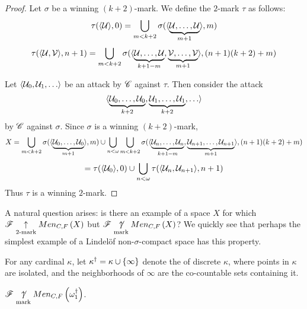 \begin{proof}
  Let $\sigma$ be a winning $(k+2)$-mark. We define the $2$-mark $\tau$ as
  follows:
    \[
      \tau(\langle\mathcal{U}\rangle,0)
        =
      \bigcup_{m<k+2}
        \sigma(\langle\underbrace{\mathcal{U},\dots,\mathcal{U}}_{m+1}\rangle,m)
    \]
    \[
      \tau(\langle\mathcal{U},\mathcal{V}\rangle,n+1)
        =
      \bigcup_{m<k+2}
        \sigma(\langle
          \underbrace{\mathcal{U},\dots,\mathcal{U}}_{k+1-m},
          \underbrace{\mathcal{V},\dots,\mathcal{V}}_{m+1}
        \rangle,(n+1)(k+2)+m)
    \]

  Let $\<\mc U_0,\mc U_1,\dots\>$ be an attack by $\mathscr{C}$ against $\tau$.
  Then consider the attack
    \[
      \<
        \underbrace{\mc U_0,\dots,\mc U_0}_{k+2},
        \underbrace{\mc U_1,\dots,\mc U_1}_{k+2},
        \dots
      \>
    \]
  by $\mathscr{C}$ against $\sigma$. Since $\sigma$ is a winning $(k+2)$-mark,
    \[
      X
        =
      \bigcup_{m<k+2}
        \sigma(\langle\underbrace{\mathcal{U}_0,\dots,\mathcal{U}_0}_{m+1}\rangle,m)
      \cup
      \bigcup_{n<\omega}
      \bigcup_{m<k+2}
        \sigma(\langle
          \underbrace{\mathcal{U}_n,\dots,\mathcal{U}_n}_{k+1-m},
          \underbrace{\mathcal{U}_{n+1},\dots,\mathcal{U}_{n+1}}_{m+1}
        \rangle,(n+1)(k+2)+m)
    \]
    \[
      =
      \tau(\langle\mathcal{U}_0\rangle,0)
      \cup
      \bigcup_{n<\omega}
      \tau(\langle\mathcal{U}_n,\mathcal{U}_{n+1}\rangle,n+1)
    \]
  Thus $\tau$ is a winning $2$-mark.
\end{proof}

A natural question arises: is there an example of a space $X$ for which
$\mathscr{F}\underset{2\text{-mark}}{\uparrow}Men_{C,F}\left({X}\right)$ but $\mathscr{F}\underset{\text{mark}}{\not\uparrow}Men_{C,F}\left({X}\right)$? We quickly
see that perhaps the simplest example of a Lindel\"of non-$\sigma$-compact
space has this property.

\begin{defn}
  For any cardinal $\kappa$, let $\kappa^\dagger=\kappa\cup\{\infty\}$ denote
  the  of discrete $\kappa$, where points in
  $\kappa$ are isolated, and the neighborhoods of $\infty$ are the co-countable
  sets containing it.
\end{defn}

\begin{thm}
  $\mathscr{F} \underset{\text{mark}}{\not\uparrow} Men_{C,F}\left({\omega_1^\dagger}\right)$.
\end{thm}

